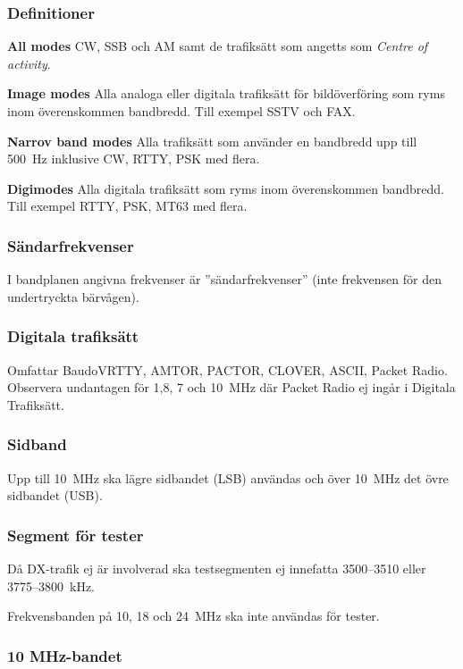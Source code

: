 \subsubsection{Definitioner}

\textbf{All modes} CW, SSB och AM samt de trafiksätt som angetts som
\emph{Centre of activity}.

\textbf{Image modes} Alla analoga eller digitala trafiksätt för bildöverföring
som ryms inom överenskommen bandbredd. Till exempel SSTV och FAX.

\textbf{Narrov band modes} Alla trafiksätt som använder en bandbredd upp till
500~Hz inklusive CW, RTTY, PSK med flera.

\textbf{Digimodes} Alla digitala trafiksätt som ryms inom överenskommen
bandbredd. Till exempel RTTY, PSK, MT63 med flera.

\subsubsection{Sändarfrekvenser}

I bandplanen angivna frekvenser är ''sändarfrekvenser''
(inte frekvensen för den undertryckta bärvågen).

\subsubsection{Digitala trafiksätt}

Omfattar BaudoVRTTY, AMTOR, PACTOR, CLOVER, ASCII, Packet Radio.
Observera undantagen för 1,8, 7 och 10~MHz där Packet Radio ej
ingår i Digitala Trafiksätt.

\subsubsection{Sidband}

Upp till 10~MHz ska lägre sidbandet (LSB) användas och över 10~MHz det övre
sidbandet (USB).

\subsubsection{Segment för tester}

Då DX-trafik ej är involverad ska testsegmenten ej innefatta
3500--3510 eller 3775--3800~kHz.

Frekvensbanden på 10, 18 och 24~MHz ska inte användas för tester.

\subsubsection{10 MHz-bandet}

